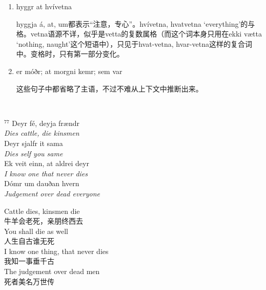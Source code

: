 \begin{grammar*}{}
    \begin{enumerate}[leftmargin=*]

        \item hyggr at hvívetna

              hyggja {\'a}, at, um都表示“注意，专心”。hvívetna, hvatvetna `everything'的与格。vetna语源不详，似乎是vetta的复数属格（而这个词本身只用在ekki vætta `nothing, naught'这个短语中），只见于hvat-vetna, hvar-vetna这样的复合词中。变格时，只有第一部分变化。

        \item er móðr; at morgni kemr; sem var

              这些句子中都省略了主语，不过不难从上下文中推断出来。
    \end{enumerate}
\end{grammar*}
\hspace*{\fill}\\ %
\begin{paracol}{2}
    \noindent
    $^{77}$ Deyr fé, deyja frændr\\
    \textit{Dies cattle, die kinsmen}\\
    Deyr sjalfr it sama\\
    \textit{Dies self you same}\\
    Ek veit einn, at aldrei deyr\\
    \textit{I know one that never dies}\\
    Dómr um dauðan hvern\\
    \textit{Judgement over dead everyone}\\
    \switchcolumn

    \noindent
    Cattle dies, kinsmen die\\
    牛羊会老死，亲朋终西去\\
    You shall die as well\\
    人生自古谁无死\\
    I know one thing, that never dies\\
    我知一事垂千古\\
    The judgement over dead men\\
    死者美名万世传\\

\end{paracol}

